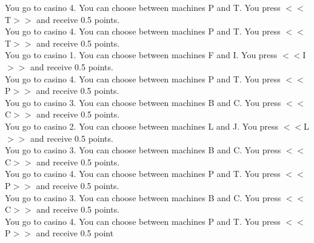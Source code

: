 \documentclass[pdflatex,sn-nature]{sn-jnl}%
\theoremstyle{thmstyleone}%
\theoremstyle{thmstyletwo}%
\theoremstyle{thmstylethree}%
\begin{document}
You go to casino 4. You can choose between machines P and T. You press $<<$T$>>$ and receive 0.5 points. $~$\\ 
You go to casino 4. You can choose between machines P and T. You press $<<$T$>>$ and receive 0.5 points. $~$\\ 
You go to casino 1. You can choose between machines F and I. You press $<<$I$>>$ and receive 0.5 points. $~$\\ 
You go to casino 4. You can choose between machines P and T. You press $<<$P$>>$ and receive 0.5 points. $~$\\ 
You go to casino 3. You can choose between machines B and C. You press $<<$C$>>$ and receive 0.5 points. $~$\\ 
You go to casino 2. You can choose between machines L and J. You press $<<$L$>>$ and receive 0.5 points. $~$\\ 
You go to casino 3. You can choose between machines B and C. You press $<<$C$>>$ and receive 0.5 points. $~$\\ 
You go to casino 4. You can choose between machines P and T. You press $<<$P$>>$ and receive 0.5 points. $~$\\ 
You go to casino 3. You can choose between machines B and C. You press $<<$C$>>$ and receive 0.5 points. $~$\\ 
You go to casino 4. You can choose between machines P and T. You press $<<$P$>>$ and receive 0.5 point 
\end{document}
